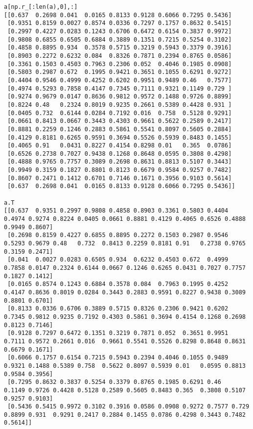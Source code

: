 \begin{verbatim}
a[np.r_[:len(a),0],:]
[[0.637  0.2698 0.041  0.0165 0.8133 0.9128 0.6066 0.7295 0.5436]
 [0.9351 0.8159 0.0027 0.8574 0.0336 0.7297 0.1757 0.8632 0.5415]
 [0.2997 0.4227 0.0283 0.1243 0.6706 0.6472 0.6154 0.3837 0.9972]
 [0.9808 0.6855 0.6505 0.6884 0.3889 0.1351 0.7215 0.5254 0.3102]
 [0.4858 0.8895 0.934  0.3578 0.5715 0.3219 0.5943 0.3379 0.3916]
 [0.8903 0.2272 0.6232 0.084  0.8326 0.7871 0.2394 0.8765 0.0586]
 [0.3361 0.1503 0.4503 0.7963 0.2306 0.052  0.4046 0.1985 0.0908]
 [0.5803 0.2987 0.672  0.1995 0.9421 0.3651 0.1055 0.6291 0.9272]
 [0.4404 0.9546 0.4999 0.4252 0.6202 0.9951 0.9489 0.46   0.7577]
 [0.4974 0.5293 0.7858 0.4147 0.7345 0.7111 0.9321 0.1149 0.729 ]
 [0.9274 0.9679 0.0147 0.8636 0.9812 0.9572 0.1488 0.9726 0.8899]
 [0.8224 0.48   0.2324 0.8019 0.9235 0.2661 0.5389 0.4428 0.931 ]
 [0.0405 0.732  0.6144 0.0284 0.7192 0.016  0.758  0.5128 0.9291]
 [0.0661 0.8413 0.0667 0.3443 0.4303 0.9661 0.5622 0.2589 0.2417]
 [0.8881 0.2259 0.1246 0.2883 0.5861 0.5541 0.8097 0.5605 0.2884]
 [0.4129 0.8181 0.6265 0.9591 0.3694 0.5526 0.5939 0.8483 0.1455]
 [0.4065 0.91   0.0431 0.8227 0.4154 0.8298 0.01   0.365  0.0786]
 [0.6526 0.2738 0.7027 0.9438 0.1268 0.8648 0.0595 0.3808 0.4298]
 [0.4888 0.9765 0.7757 0.3089 0.2698 0.8631 0.8813 0.5107 0.3443]
 [0.9949 0.3159 0.1827 0.8801 0.8123 0.6679 0.9584 0.9257 0.7482]
 [0.8607 0.2471 0.1412 0.6701 0.7146 0.1671 0.3956 0.9103 0.5614]
 [0.637  0.2698 0.041  0.0165 0.8133 0.9128 0.6066 0.7295 0.5436]]

a.T
[[0.637  0.9351 0.2997 0.9808 0.4858 0.8903 0.3361 0.5803 0.4404 0.4974 0.9274 0.8224 0.0405 0.0661 0.8881 0.4129 0.4065 0.6526 0.4888 0.9949 0.8607]
 [0.2698 0.8159 0.4227 0.6855 0.8895 0.2272 0.1503 0.2987 0.9546 0.5293 0.9679 0.48   0.732  0.8413 0.2259 0.8181 0.91   0.2738 0.9765 0.3159 0.2471]
 [0.041  0.0027 0.0283 0.6505 0.934  0.6232 0.4503 0.672  0.4999 0.7858 0.0147 0.2324 0.6144 0.0667 0.1246 0.6265 0.0431 0.7027 0.7757 0.1827 0.1412]
 [0.0165 0.8574 0.1243 0.6884 0.3578 0.084  0.7963 0.1995 0.4252 0.4147 0.8636 0.8019 0.0284 0.3443 0.2883 0.9591 0.8227 0.9438 0.3089 0.8801 0.6701]
 [0.8133 0.0336 0.6706 0.3889 0.5715 0.8326 0.2306 0.9421 0.6202 0.7345 0.9812 0.9235 0.7192 0.4303 0.5861 0.3694 0.4154 0.1268 0.2698 0.8123 0.7146]
 [0.9128 0.7297 0.6472 0.1351 0.3219 0.7871 0.052  0.3651 0.9951 0.7111 0.9572 0.2661 0.016  0.9661 0.5541 0.5526 0.8298 0.8648 0.8631 0.6679 0.1671]
 [0.6066 0.1757 0.6154 0.7215 0.5943 0.2394 0.4046 0.1055 0.9489 0.9321 0.1488 0.5389 0.758  0.5622 0.8097 0.5939 0.01   0.0595 0.8813 0.9584 0.3956]
 [0.7295 0.8632 0.3837 0.5254 0.3379 0.8765 0.1985 0.6291 0.46   0.1149 0.9726 0.4428 0.5128 0.2589 0.5605 0.8483 0.365  0.3808 0.5107 0.9257 0.9103]
 [0.5436 0.5415 0.9972 0.3102 0.3916 0.0586 0.0908 0.9272 0.7577 0.729  0.8899 0.931  0.9291 0.2417 0.2884 0.1455 0.0786 0.4298 0.3443 0.7482 0.5614]]


\end{verbatim}
